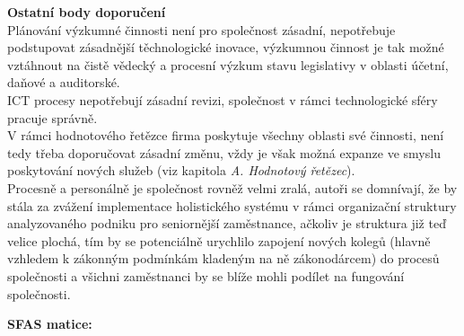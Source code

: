 \noindent\textbf{Ostatní body doporučení}\\

Plánování výzkumné činnosti není pro společnost zásadní, nepotřebuje podstupovat zásadnější těchnologické inovace, výzkumnou činnost je tak možné vztáhnout na čistě vědecký a procesní výzkum stavu legislativy v oblasti účetní, daňové a auditorské.\\

ICT procesy nepotřebují zásadní revizi, společnost v rámci technologické sféry pracuje správně.\\

V rámci hodnotového řetězce firma poskytuje všechny oblasti své činnosti, není tedy třeba doporučovat zásadní změnu, vždy je však možná expanze ve smyslu poskytování nových služeb (viz kapitola \textit{A. Hodnotový řetězec}).\\

Procesně a personálně je společnost rovněž velmi zralá, autoři se domnívají, že by stála za zvážení implementace holistického systému v rámci organizační struktury analyzovaného podniku pro seniornější zaměstnance, ačkoliv je struktura již teď velice plochá, tím by se potenciálně urychlilo zapojení nových kolegů (hlavně vzhledem k zákonným podmínkám kladeným na ně zákonodárcem) do procesů společnosti a všichni zaměstnanci by se blíže mohli podílet na fungování společnosti.\\






\newpage

\noindent\textbf{SFAS matice:}

